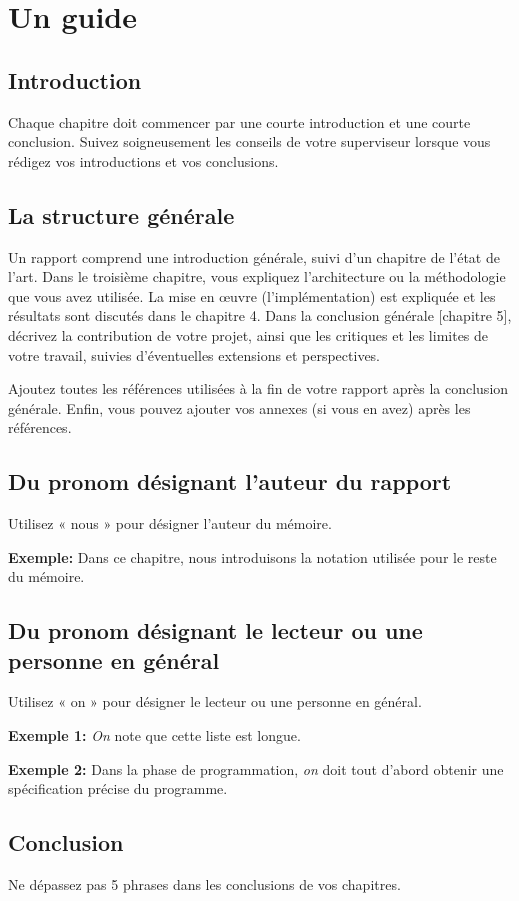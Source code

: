 \chapter{Un guide}

\section{\texorpdfstring{Introduction}{Introduction}}
Chaque chapitre doit commencer par une courte introduction et une courte conclusion. Suivez soigneusement les conseils de votre superviseur lorsque vous rédigez vos introductions et vos conclusions. 

\section{La structure générale}
Un rapport comprend une introduction générale, suivi d'un chapitre de l’état de l'art. Dans le troisième chapitre, vous expliquez l'architecture ou la méthodologie que vous avez utilisée. La mise en œuvre (l’implémentation) est expliquée et les résultats sont discutés dans le chapitre 4. Dans la conclusion générale [chapitre 5], décrivez la contribution de votre projet, ainsi que les critiques et les limites de votre travail, suivies d'éventuelles extensions et perspectives.

Ajoutez toutes les références utilisées à la fin de votre rapport après la conclusion générale. Enfin, vous pouvez ajouter vos annexes (si vous en avez) après les références.



\section{Du pronom désignant l'auteur du rapport}
Utilisez « nous » pour désigner l'auteur du mémoire.

\textbf{Exemple:} Dans ce chapitre, nous introduisons la notation utilisée pour le reste du mémoire.

\section{Du pronom désignant le lecteur ou une personne en général}
Utilisez « on » pour désigner le lecteur ou une personne en général.

\textbf{Exemple 1:} \textit{On} note que cette liste est longue.

\textbf{Exemple 2:} Dans la phase de programmation, \textit{on} doit tout d'abord obtenir une spécification précise du programme.

\section{Conclusion}
Ne dépassez pas 5 phrases dans les conclusions de vos chapitres. 